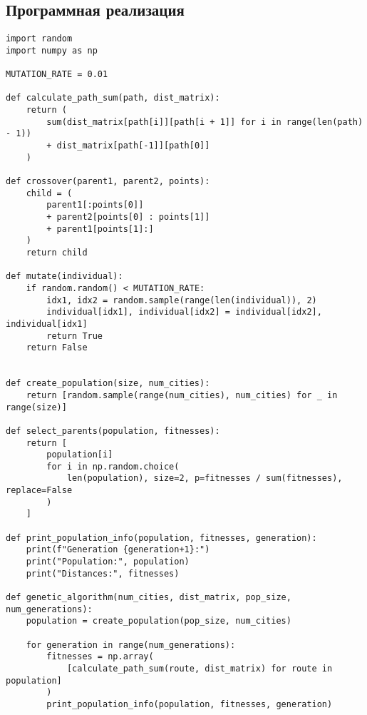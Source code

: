 \subsection{Программная реализация}

\begin{lstlisting}
import random
import numpy as np

MUTATION_RATE = 0.01

def calculate_path_sum(path, dist_matrix):
    return (
        sum(dist_matrix[path[i]][path[i + 1]] for i in range(len(path) - 1))
        + dist_matrix[path[-1]][path[0]]
    )

def crossover(parent1, parent2, points):
    child = (
        parent1[:points[0]]
        + parent2[points[0] : points[1]]
        + parent1[points[1]:]
    )
    return child

def mutate(individual):
    if random.random() < MUTATION_RATE:
        idx1, idx2 = random.sample(range(len(individual)), 2)
        individual[idx1], individual[idx2] = individual[idx2], individual[idx1]
        return True
    return False


def create_population(size, num_cities):
    return [random.sample(range(num_cities), num_cities) for _ in range(size)]

def select_parents(population, fitnesses):
    return [
        population[i]
        for i in np.random.choice(
            len(population), size=2, p=fitnesses / sum(fitnesses), replace=False
        )
    ]

def print_population_info(population, fitnesses, generation):
    print(f"Generation {generation+1}:")
    print("Population:", population)
    print("Distances:", fitnesses)

def genetic_algorithm(num_cities, dist_matrix, pop_size, num_generations):
    population = create_population(pop_size, num_cities)

    for generation in range(num_generations):
        fitnesses = np.array(
            [calculate_path_sum(route, dist_matrix) for route in population]
        )
        print_population_info(population, fitnesses, generation)


\end{lstlisting}
